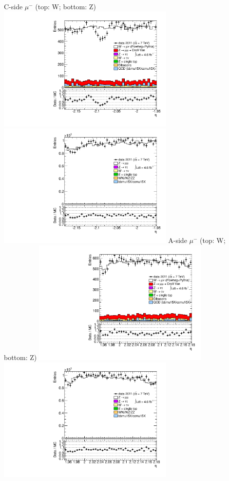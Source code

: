  {
\colb[T]
C-side $\mu^{-}$ (top: W; bottom: Z)
\centering
\includegraphics[width=0.66\textwidth]{dates/20130306/figures/etaphi/WpItoI_10_C_stack_l_eta_NEG} \\
\includegraphics[width=0.66\textwidth]{dates/20130306/figures/etaphi/Z_10_C_stack_lN_eta_ALL.pdf}
A-side $\mu^{-}$ (top: W; bottom: Z)
\centering
\includegraphics[width=0.66\textwidth]{dates/20130306/figures/etaphi/WpItoI_10_A_stack_l_eta_NEG} \\
\includegraphics[width=0.66\textwidth]{dates/20130306/figures/etaphi/Z_10_A_stack_lN_eta_ALL.pdf} 
\cole
}
